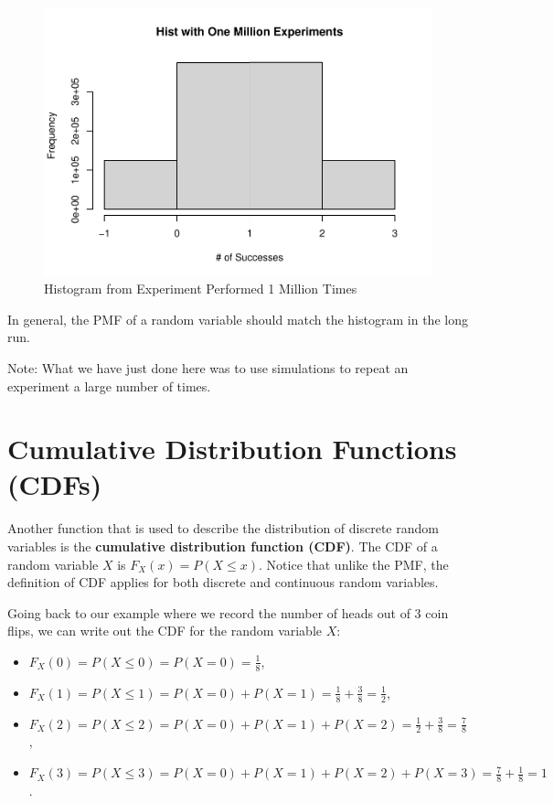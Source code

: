 \documentclass[
]{book}
\providecommand{\tightlist}{%
  \setlength{\itemsep}{0pt}\setlength{\parskip}{0pt}}
\begin{document}
\begin{figure}
\centering
\includegraphics{bookdown-demo_files/figure-latex/3-sim-1.pdf}
\caption{\label{fig:3-sim}Histogram from Experiment Performed 1 Million Times}
\end{figure}

In general, the PMF of a random variable should match the histogram in the long run.

Note: What we have just done here was to use simulations to repeat an experiment a large number of times.

\hypertarget{CDFs}{%
\section{Cumulative Distribution Functions (CDFs)}\label{CDFs}}

Another function that is used to describe the distribution of discrete random variables is the \textbf{cumulative distribution function (CDF)}. The CDF of a random variable \(X\) is \(F_X(x) = P(X \leq x)\). Notice that unlike the PMF, the definition of CDF applies for both discrete and continuous random variables.

Going back to our example where we record the number of heads out of 3 coin flips, we can write out the CDF for the random variable \(X\):

\begin{itemize}
\tightlist
\item
  \(F_X(0) = P(X \leq 0) = P(X=0) = \frac{1}{8}\),
\item
  \(F_X(1) = P(X \leq 1) = P(X=0) + P(X=1) = \frac{1}{8} + \frac{3}{8} = \frac{1}{2}\),
\item
  \(F_X(2) = P(X \leq 2) = P(X=0) + P(X=1) + P(X=2) = \frac{1}{2} + \frac{3}{8} = \frac{7}{8}\),
\item
  \(F_X(3) = P(X \leq 3) = P(X=0) + P(X=1) + P(X=2) + P(X=3) = \frac{7}{8} + \frac{1}{8} = 1\).
\end{itemize}
\end{document}
